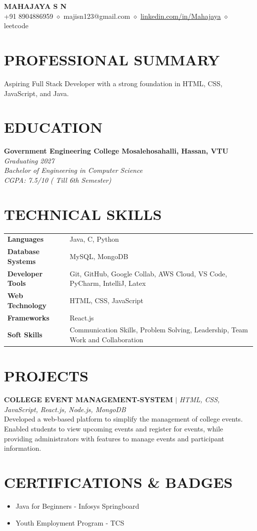 \documentclass[10pt,a4paper]{article}
\begin{document}
\begin{center}
{\Large \textbf{MAHAJAYA S N}} \\ \vspace{2pt}
+91 8904886959 $\diamond$ majisn123@gmail.com $\diamond$ \href{https://linkedin.com}{linkedin.com/in/Mahajaya} $\diamond$ leetcode
\end{center}
\section*{PROFESSIONAL SUMMARY}
Aspiring Full Stack Developer with a strong foundation in HTML, CSS, JavaScript, and Java.
\section*{EDUCATION}
\noindent \textbf{Government Engineering College Mosalehosahalli, Hassan, VTU} \hfill \textit{Graduating 2027} \\
\textit{Bachelor of Engineering in Computer Science} \\
\textit{CGPA: 7.5/10 ( Till 6th Semester)} \vspace{4pt}
\section*{TECHNICAL SKILLS}
\begin{tabular}{@{}p{1.6in}p{5.3in}@{}}
\textbf{Languages} & Java, C, Python \\
\textbf{Database Systems} & MySQL, MongoDB \\
\textbf{Developer Tools} & Git, GitHub, Google Collab, AWS Cloud, VS Code, PyCharm, IntelliJ, Latex \\
\textbf{Web Technology} & HTML, CSS, JavaScript \\
\textbf{Frameworks} & React.js \\
\textbf{Soft Skills} & Communication Skills, Problem Solving, Leadership, Team Work and Collaboration \\
\end{tabular}
\section*{PROJECTS}
\noindent \textbf{COLLEGE EVENT MANAGEMENT-SYSTEM} $|$ \textit{HTML, CSS, JavaScript, React.js, Node.js, MongoDB} \\
Developed a web-based platform to simplify the management of college events. Enabled students to view upcoming events and register for events, while providing administrators with features to manage events and participant information. \vspace{4pt}
\section*{CERTIFICATIONS \& BADGES}
\begin{itemize}[leftmargin=0.2in, itemsep=1pt, topsep=1pt]
\item Java for Beginners - Infosys Springboard
\item Youth Employment Program - TCS
\end{itemize}
\end{document}
